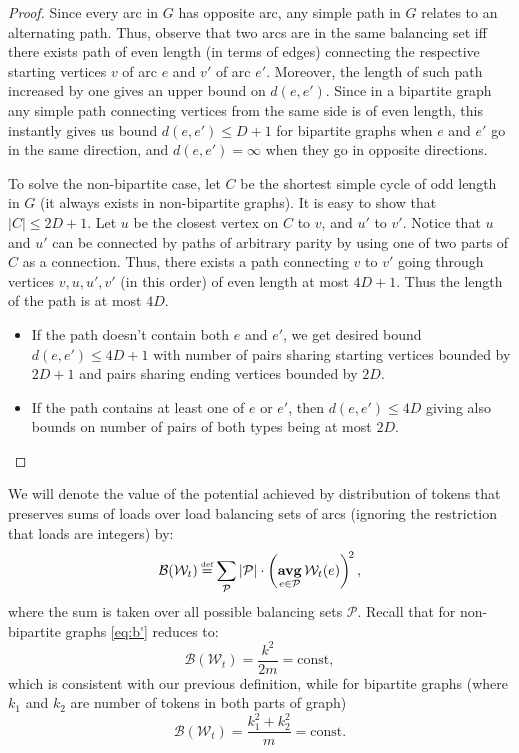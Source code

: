 \documentclass{article}[11pt,letter]
\newcommand{\wload}{\mathcal{W}}
\newcommand{\const}{\mathrm{const}}
\newcommand\defeq{\stackrel{\mathclap{\normalfont{\mbox{\text{\tiny{def}}}}}}{=}}
\DeclareMathOperator*{\avg}{\mathbf{avg}}
\begin{document}
\begin{proof}
Since every arc in $G$ has opposite arc, any simple path in $G$ relates to an alternating path. Thus, observe that two arcs are in the same balancing set iff there exists path of even length (in terms of edges) connecting the respective starting vertices $v$ of arc $e$ and $v'$ of arc $e'$. Moreover, the length of such path increased by one gives an upper bound on $d(e,e')$.
Since in a bipartite graph any simple path connecting vertices from the same side is of even length, this instantly gives us bound $d(e,e') \le D+1$ for bipartite graphs when $e$ and $e'$ go in the same direction, and $d(e,e')=\infty$ when they go in opposite directions.

To solve the non-bipartite case, let $C$ be the shortest simple cycle of odd length in $G$ (it always exists in non-bipartite graphs). It is easy to show that $|C| \le 2D+1$. Let $u$ be the closest vertex on $C$ to $v$, and $u'$ to $v'$. Notice that $u$ and $u'$ can be connected by paths of arbitrary parity by using one of two parts of $C$ as a connection. Thus, there exists a path connecting $v$ to $v'$ going through vertices $v,u,u',v'$ (in this order) of even length at most $4D+1$. Thus the length of the path is at most $4D$. \begin{itemize} \item If the path doesn't contain both $e$ and $e'$, we get desired bound $d(e,e') \le 4D+1$ with number of pairs sharing starting vertices bounded by $2D+1$ and pairs sharing ending vertices bounded by $2D$. \item If the path contains at least one of $e$ or $e'$, then  $d(e,e') \le 4D$ giving also bounds on number of pairs of both types being at most $2D$.
\end{itemize}

\end{proof}


We will denote the value of the potential achieved by distribution of tokens that preserves sums of loads over load balancing sets of arcs (ignoring the restriction that loads are integers) by:
\begin{equation}\label{eq:b'}\mathcal{B}(\wload_t) \defeq \sum_{\mathcal{P}}|\mathcal{P}|\cdot\left( \avg_{e \in \mathcal{P}} \wload_t(e)\right)^{\!2},\end{equation}
where the sum is taken over all possible balancing sets $\mathcal{P}$.
Recall that for non-bipartite graphs \eqref{eq:b'} reduces to:
$$\mathcal{B}(\wload_t) = \frac{k^2}{2m} = \const,$$
which is consistent with our previous definition,
while for bipartite graphs (where $k_1$ and $k_2$ are number of tokens in both parts of graph)
$$\mathcal{B}(\wload_t) = \frac{k_1^2+k_2^2}{m} = \const.$$
\end{document}
